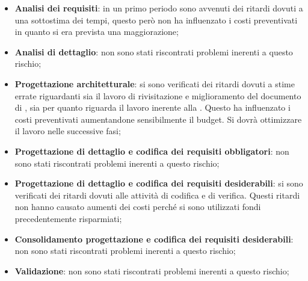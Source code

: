 			\begin{itemize}
				\item \textbf{Analisi dei requisiti}: in un primo periodo sono avvenuti dei ritardi dovuti a una sottostima dei tempi, questo però non ha influenzato i costi preventivati in quanto si era prevista una maggiorazione;
				\item \textbf{Analisi di dettaglio}: non sono stati riscontrati problemi inerenti a questo rischio;
				\item \textbf{Progettazione architetturale}: si sono verificati dei ritardi dovuti a stime errate riguardanti sia il lavoro di rivisitazione e miglioramento del documento di \docNameVersionAdR, sia per quanto riguarda il lavoro inerente alla \docNameVersionST. Questo ha influenzato i costi preventivati aumentandone sensibilmente il budget. Si dovrà ottimizzare il lavoro nelle successive fasi;
				\item \textbf{Progettazione di dettaglio e codifica dei requisiti obbligatori}: non sono stati riscontrati problemi inerenti a questo rischio;
				\item \textbf{Progettazione di dettaglio e codifica dei requisiti desiderabili}: si sono verificati dei ritardi dovuti alle attività di codifica e di verifica. Questi ritardi non hanno causato aumenti dei costi perché si sono utilizzati fondi precedentemente risparmiati;
				\item \textbf{Consolidamento progettazione e codifica dei requisiti desiderabili}: non sono stati riscontrati problemi inerenti a questo rischio;
				\item \textbf{Validazione}: non sono stati riscontrati problemi inerenti a questo rischio;
			\end{itemize}



